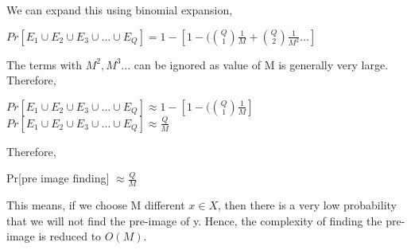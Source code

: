 \documentclass[11pt]{article}
\begin{document}
We can expand this using binomial expansion,
\begin{center}
    $Pr[E_1 \cup E_2 \cup E_3 \cup \dots \cup E_Q] = 1 - [1-(\binom{Q}{1} \frac{1}{M} + \binom{Q}{2} \frac{1}{M^2} \dots]$\\
\end{center}
The terms with $M^2, M^3...$ can be ignored as value of M is generally very large. Therefore, 
\begin{center}
     $Pr[E_1 \cup E_2 \cup E_3 \cup \dots \cup E_Q] \approx  1 - [1-(\binom{Q}{1} \frac{1}{M}]$\\
    \vspace{3mm}
    $Pr[E_1 \cup E_2 \cup E_3 \cup \dots \cup E_Q] \approx \frac{Q}{M}$
\end{center}
Therefore, 
\begin{center}
    Pr[pre image finding] $\approx \frac{Q}{M}$\\
\end{center}
This means, if we choose M different $x \in X$, then there is a very low probability that we will not find the pre-image of y. Hence, the complexity of finding the pre-image is reduced to $O(M)$.
\end{document}
